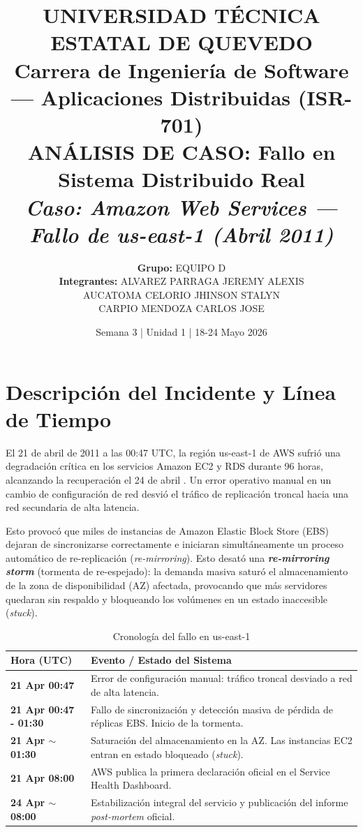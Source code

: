 \documentclass[10pt,a4paper]{article}
\title{
    \vspace{-1.5cm}
    \small \textbf{UNIVERSIDAD TÉCNICA ESTATAL DE QUEVEDO} \\
    Carrera de Ingeniería de Software --- Aplicaciones Distribuidas (ISR-701) \\
    \large \vspace{0.3cm} \textbf{ANÁLISIS DE CASO: Fallo en Sistema Distribuido Real} \\
    \small \textit{Caso: Amazon Web Services --- Fallo de us-east-1 (Abril 2011)}
}
\author{
    \textbf{Grupo:} EQUIPO D \\
    \textbf{Integrantes:} ALVAREZ PARRAGA JEREMY ALEXIS \\
    AUCATOMA CELORIO JHINSON STALYN \\
    CARPIO MENDOZA CARLOS JOSE
}
\date{Semana 3 | Unidad 1 | 18-24 Mayo 2026}
\begin{document}
\maketitle

\section{Descripción del Incidente y Línea de Tiempo}
El 21 de abril de 2011 a las 00:47 UTC, la región us-east-1 de AWS sufrió una degradación crítica en los servicios Amazon EC2 y RDS durante 96 horas, alcanzando la recuperación el 24 de abril \cite{aws2011}. Un error operativo manual en un cambio de configuración de red desvió el tráfico de replicación troncal hacia una red secundaria de alta latencia. 

Esto provocó que miles de instancias de Amazon Elastic Block Store (EBS) dejaran de sincronizarse correctamente e iniciaran simultáneamente un proceso automático de re-replicación (\textit{re-mirroring}). Esto desató una \textbf{\textit{re-mirroring storm}} (tormenta de re-espejado): la demanda masiva saturó el almacenamiento de la zona de disponibilidad (AZ) afectada, provocando que más servidores quedaran sin respaldo y bloqueando los volúmenes en un estado inaccesible (\textit{stuck}).

\begin{table}[h!]
\footnotesize
\centering
\caption{Cronología del fallo en us-east-1}
\vspace{0.1cm}
\begin{tabularx}{\textwidth}{lX}
\toprule
\textbf{Hora (UTC)} & \textbf{Evento / Estado del Sistema} \\
\midrule
\textbf{21 Apr 00:47} & Error de configuración manual: tráfico troncal desviado a red de alta latencia. \\
\textbf{21 Apr 00:47 - 01:30} & Fallo de sincronización y detección masiva de pérdida de réplicas EBS. Inicio de la tormenta. \\
\textbf{21 Apr $\sim$01:30} & Saturación del almacenamiento en la AZ. Las instancias EC2 entran en estado bloqueado (\textit{stuck}). \\
\textbf{21 Apr 08:00} & AWS publica la primera declaración oficial en el Service Health Dashboard. \\
\textbf{24 Apr $\sim$08:00} & Estabilización integral del servicio y publicación del informe \textit{post-mortem} oficial. \\
\bottomrule
\end{tabularx}
\end{table}
\end{document}
